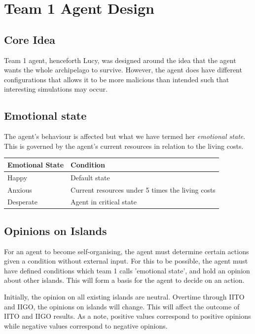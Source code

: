\chapter{Team 1 Agent Design}

\section{Core Idea}
Team 1 agent, henceforth Lucy, was designed around the idea that the agent wants the whole archipelago to survive. However, the agent does have different configurations that allows it to be more malicious than intended such that interesting simulations may occur.

\section{Emotional state}

The agent's behaviour is affected but what we have termed her \emph{emotional state}. This is governed by the agent's current resources in relation to the living costs.

\begin{table} [htb]
    \centering
    \begin{tabular}{|l|l|}
        \hline
        Emotional State & Condition \\
        \hline
        Happy & Default state \\
        \hline
        Anxious & Current resources under 5 times the living costs \\
        \hline
        Desperate & Agent in critical state \\
        \hline
    \end{tabular}
\end{table}


\section{Opinions on Islands}
For an agent to become self-organising, the agent must determine certain actions given a condition without external input. For this to be possible, the agent must have defined conditions which team 1 calls 'emotional state', and hold an opinion about other islands. This will form a basis for the agent to decide on an action.

Initially, the opinion on all existing islands are neutral. Overtime through IITO and IIGO, the opinions on islands will change. This will affect the outcome of IITO and IIGO results. As a note, positive values correspond to positive opinions while negative values correspond to negative opinions.

